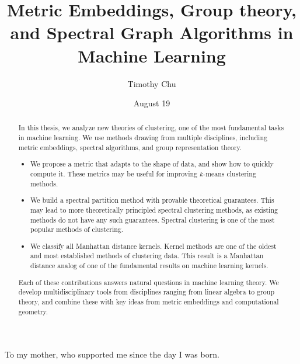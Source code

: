 \documentclass[12pt]{cmuthesis}
\begin{document}
 
\frontmatter

\pagestyle{empty}

\title{ 
{\bf Metric Embeddings, Group theory, and Spectral Graph Algorithms in Machine Learning}}
\author{Timothy Chu}
\date{August 19}
\trnumber{}


\support{}
\disclaimer{}



\maketitle

\begin{dedication}
To my mother, who supported me since the day I was born.
\end{dedication}

\pagestyle{plain} %


\begin{abstract}
In this thesis, we analyze new theories of clustering, one of the most fundamental tasks in machine learning. We use methods drawing from multiple disciplines, including metric embeddings, spectral algorithms, and group representation theory.
\begin{itemize}
\item We propose a metric that adapts to the shape of data, and show how to quickly compute it. These metrics may be useful for improving $k$-means clustering methods.
\item We build a spectral partition method with provable theoretical guarantees. This may lead to more theoretically principled spectral clustering methods, as existing methods do not have any such guarantees. Spectral clustering is one of the most popular methods of clustering.
\item We classify all Manhattan distance kernels. Kernel methods are one of the oldest and most established methods of clustering data. This result is a Manhattan distance analog of one of the fundamental results on machine learning kernels. 
\end{itemize}
Each of these contributions answers natural questions in machine
  learning theory. We develop multidisciplinary tools from disciplines
  ranging from linear algebra to group theory, and combine these with
  key ideas from metric embeddings and computational geometry.

\end{abstract}
\iffalse
\end{document}
